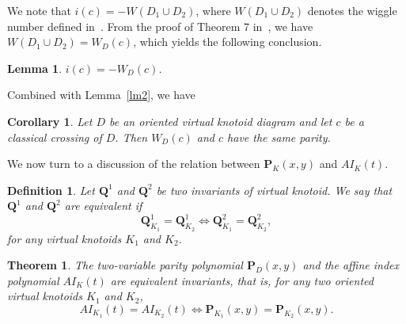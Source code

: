 \documentclass[12pt]{amsart}
\theoremstyle{noparens}
\newtheorem{theorem}{Theorem}[section]
\newtheorem{corollary}{Corollary}[section]
\newtheorem{lemma}{Lemma}[section]
\newtheorem{definition}{Definition}[section]
\numberwithin{equation}{section}
\numberwithin{equation}{section}
\begin{document}
We note that $i(c) = -W(D_1\cup D_2)$, where $W(D_1\cup D_2)$ denotes the wiggle number defined in~\cite{FK}. From the proof of Theorem 7 in~\cite{FK}, we have $W(D_1\cup D_2)=W_D(c)$, which yields the following conclusion.

\begin{lemma}
	$i(c)=-W_D(c)$. \label{lm1}
\end{lemma}

Combined with Lemma~\ref{lm2}, we have

\begin{corollary} \label{cor:weight-parity}
	Let $D$ be an oriented virtual knotoid diagram and let $c$ be a classical crossing of $D$.	Then $W_D(c)$ and $c$ have the same parity.
\end{corollary}

We now turn to a discussion of the relation between $\mathbf{P}_K(x,y)$ and $AI_K(t)$.

\begin{definition}
	Let $\mathbf{Q}^1$ and $\mathbf{Q}^2$ be two invariants of virtual knotoid. We say that $\mathbf{Q}^1$ and $\mathbf{Q}^2$ are equivalent if $$\mathbf{Q}^1_{K_1}=\mathbf{Q}^1_{K_2} \iff \mathbf{Q}^2_{K_1}=\mathbf{Q}^2_{K_2},$$ for any virtual knotoids $K_1$ and $K_2$.
\end{definition}

\begin{theorem}\label{thm2} 
	The two-variable parity polynomial $\mathbf{P}_D(x,y)$ and the affine index polynomial $AI_K(t)$ are equivalent invariants, that is, for any two oriented virtual knotoids $K_1$ and $K_2$,
	$$
	AI_{K_1}(t)=AI_{K_2}(t)
	\iff
	\mathbf P_{K_1}(x,y)=
	\mathbf P_{K_2}(x,y).
	$$
\end{theorem}
\end{document}
